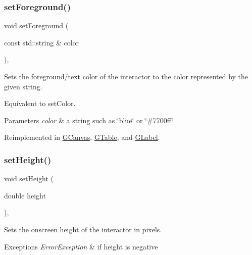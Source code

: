 \subsubsection{\texorpdfstring{set\+Foreground()}{setForeground()}\hspace{0.1cm}{\footnotesize\ttfamily [2/2]}}
{\footnotesize\ttfamily void set\+Foreground (\begin{DoxyParamCaption}\item[{const std\+::string \&}]{color }\end{DoxyParamCaption})\hspace{0.3cm}{\ttfamily [virtual]}, {\ttfamily [inherited]}}



Sets the foreground/text color of the interactor to the color represented by the given string. 

Equivalent to set\+Color. 
\begin{DoxyParams}{Parameters}
{\em color} & a string such as \char`\"{}blue\char`\"{} or \char`\"{}\#7700ff\char`\"{} \\
\hline
\end{DoxyParams}


Reimplemented in \mbox{\hyperlink{classsgl_1_1GCanvas_a8afbcf1f47750fb4c717f9ff36540235}{G\+Canvas}}, \mbox{\hyperlink{classsgl_1_1GTable_a8afbcf1f47750fb4c717f9ff36540235}{G\+Table}}, and \mbox{\hyperlink{classsgl_1_1GLabel_a8afbcf1f47750fb4c717f9ff36540235}{G\+Label}}.

\mbox{\label{classsgl_1_1GInteractor_a9e280bfc4544dfaf8e4376c4e1a74357}} 
\subsubsection{\texorpdfstring{set\+Height()}{setHeight()}}
{\footnotesize\ttfamily void set\+Height (\begin{DoxyParamCaption}\item[{double}]{height }\end{DoxyParamCaption})\hspace{0.3cm}{\ttfamily [virtual]}, {\ttfamily [inherited]}}



Sets the onscreen height of the interactor in pixels. 


\begin{DoxyExceptions}{Exceptions}
{\em Error\+Exception} & if height is negative \\
\hline
\end{DoxyExceptions}


